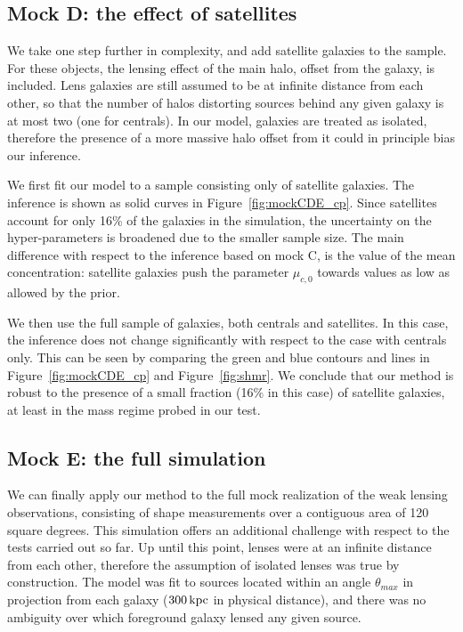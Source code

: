 \documentclass[usenatbib]{mnras}
\def\thetamax{\theta_{max}}
\def\Fref#1{Figure~\ref{#1}\xspace}
\begin{document}
\subsection{Mock D: the effect of satellites}

We take one step further in complexity, and add satellite galaxies to the sample.
For these objects, the lensing effect of the main halo, offset from the galaxy, is included.
Lens galaxies are still assumed to be at infinite distance from each other, so that the number of halos distorting sources behind any given galaxy is at most two (one for centrals).
In our model, galaxies are treated as isolated, therefore the presence of a more massive halo offset from it could in principle bias our inference.

We first fit our model to a sample consisting only of satellite galaxies. The inference is shown as solid curves in \Fref{fig:mockCDE_cp}. Since satellites account for only 16\% of the galaxies in the simulation, the uncertainty on the hyper-parameters is broadened due to the smaller sample size.
The main difference with respect to the inference based on mock C, is the value of the mean concentration: satellite galaxies push the parameter $\mu_{c,0}$ towards values as low as allowed by the prior.

We then use the full sample of galaxies, both centrals and satellites. In this case, the inference does not change significantly with respect to the case with centrals only. This can be seen by comparing the green and blue contours and lines in \Fref{fig:mockCDE_cp} and \Fref{fig:shmr}.
We conclude that our method is robust to the presence of a small fraction (16\% in this case) of satellite galaxies, at least in the mass regime probed in our test.

\subsection{Mock E: the full simulation}\label{ssec:full}

We can finally apply our method to the full mock realization of the weak lensing observations, consisting of shape measurements over a contiguous area of 120 square degrees.
This simulation offers an additional challenge with respect to the tests carried out so far.
Up until this point, lenses were at an infinite distance from each other, therefore the assumption of isolated lenses was true by construction.
The model was fit to sources located within an angle $\thetamax$ in projection from each galaxy ($300\,\rm{kpc}$ in physical distance), and there was no ambiguity over which foreground galaxy lensed any given source.
\end{document}
